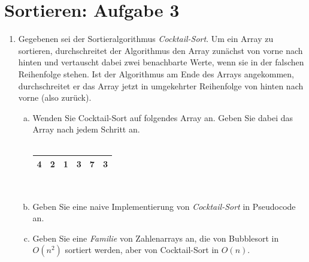 \documentclass{scrartcl}
\begin{document}
\section*{Sortieren: Aufgabe 3}
\begin{enumerate}[(1)]

\item Gegebenen sei der Sortieralgorithmus \emph{Cocktail-Sort}. Um ein Array zu sortieren, durchschreitet der Algorithmus den Array zun\"achst von vorne nach hinten und vertauscht dabei zwei benachbarte Werte, wenn sie in der falschen Reihenfolge stehen. Ist der Algorithmus am Ende des Arrays angekommen, durchschreitet er das Array jetzt in umgekehrter Reihenfolge von hinten nach vorne (also \glqq zur\"uck\grqq).
\begin{enumerate}[(a)]
\item Wenden Sie Cocktail-Sort auf folgendes Array an. Geben Sie dabei das Array nach jedem Schritt an. \\
\\
\begin{center}
\begin{tabular}{|c|c|c|c|c|c|}
\hline
4 & 2 & 1 & 3 & 7 & 3 \\
\hline
\end{tabular}
\end{center}
\text{ } \\
\item Geben Sie eine naive Implementierung von \emph{Cocktail-Sort} in Pseudocode an.
\item Geben Sie eine \emph{Familie} von Zahlenarrays an, die von Bubblesort in $O(n^2)$ sortiert werden, aber von Cocktail-Sort in $O(n)$.
\end{enumerate}

\end{enumerate}
\end{document}

